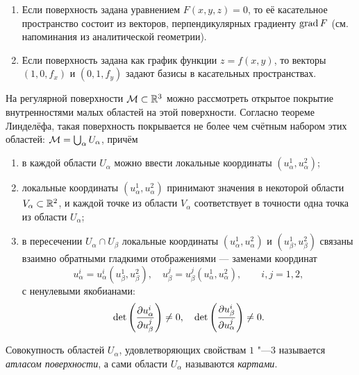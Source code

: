 \begin{example}
	\begin{enumerate}[nolistsep, label=(\arabic*)]
		\item Если поверхность задана уравнением $F(x, y, z) = 0$, то её касательное пространство состоит из векторов, перпендикулярных градиенту $\operatorname{grad} F$ (см. напоминания из аналитической геометрии).
		\item Если поверхность задана как график функции $z = f(x, y)$, то векторы $(1, 0, f_x)$ и $(0, 1, f_y)$ задают базисы в касательных пространствах.
	\end{enumerate}
\end{example}

На регулярной поверхности $\mathcal{M} \subset \mathbb{R}^3$ можно рассмотреть открытое покрытие внутренностями малых областей на этой поверхности. Согласно теореме Линделёфа\footnotemark, такая поверхность покрывается не более чем счётным набором этих областей: $\mathcal{M} = \bigcup_\alpha U_\alpha$, причём


\begin{enumerate}[nolistsep, label=(\arabic*)]
	\item в каждой области $U_\alpha$ можно ввести локальные координаты $(u^1_\alpha, u^2_\alpha)$;
	\item локальные координаты $(u^1_\alpha, u^2_\alpha)$ принимают значения в некоторой области $V_\alpha \subset \mathbb{R}^2$, и каждой точке из области $V_\alpha$ соответствует в точности одна точка из области $U_\alpha$;
	\item в пересечении $U_\alpha \cap U_\beta$ локальные координаты $(u^1_\alpha, u^2_\alpha)$ и $(u^1_\beta, u^2_\beta)$ связаны взаимно обратными гладкими отображениями --- заменами координат
		\[
			u^i_\alpha = u^i_\alpha(u^1_\beta, u^2_\beta),\quad u^j_\beta = u^j_\beta(u^1_\alpha, u^2_\alpha),\qquad i, j = 1, 2,
		\]
		с ненулевыми якобианами:
		\[
			\det\left(\frac{\partial u^i_\alpha}{\partial u^j_\beta}\right) \ne 0,\quad \det\left(\frac{\partial u^i_\beta}{\partial u^j_\alpha}\right) \ne 0.
		\]
\end{enumerate}

\begin{definition}
	Совокупность областей $U_\alpha$, удовлетворяющих свойствам $1$ "---$3$ называется \textit{атласом поверхности}, а сами области $U_\alpha$ называются \textit{картами}.
\end{definition}

